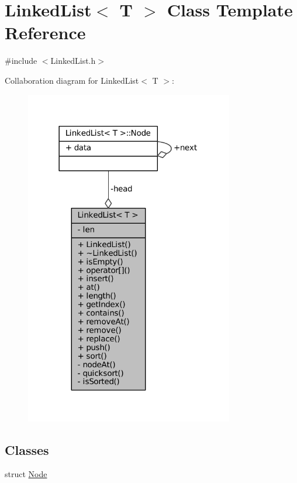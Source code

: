 \hypertarget{classLinkedList}{}\section{Linked\+List$<$ T $>$ Class Template Reference}
\label{classLinkedList}


{\ttfamily \#include $<$Linked\+List.\+h$>$}



Collaboration diagram for Linked\+List$<$ T $>$\+:
\nopagebreak
\begin{figure}[H]
\begin{center}
\leavevmode
\includegraphics[width=258pt]{classLinkedList__coll__graph}
\end{center}
\end{figure}
\subsection*{Classes}
\begin{DoxyCompactItemize}
\item 
struct \hyperlink{structLinkedList_1_1Node}{Node}
\end{DoxyCompactItemize}
